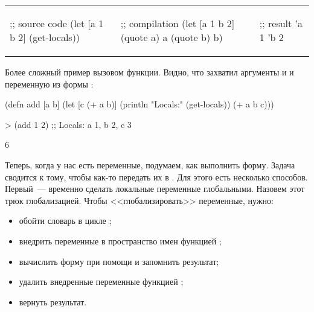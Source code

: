 \begin{english}
\noindent
\begin{tabular}{ @{}p{4cm} @{}p{4cm} @{}p{3cm} }

  \begin{clojure}
;; source code
(let [a 1
      b 2]
  (get-locals))
  \end{clojure}

&

  \begin{clojure}
;; compilation
(let [a 1
      b 2]
  {(quote a) a
   (quote b) b})
  \end{clojure}

&

  \begin{clojure}
;; result
{'a 1 'b 2}
  \end{clojure}

\end{tabular}
\end{english}

Более сложный пример вызовом функции. Видно, что  захватил аргументы  и  и переменную  из формы :

\begin{english}
  \begin{clojure}
(defn add
  [a b]
  (let [c (+ a b)]
    (println "Locals:" (get-locals))
    (+ a b c)))

> (add 1 2)
;; Locals: {a 1, b 2, c 3}

6
  \end{clojure}
\end{english}

Теперь, когда у нас есть переменные, подумаем, как выполнить форму. Задача сводится к тому, чтобы как-то передать их в . Для этого есть несколько способов. Первый~--- временно сделать локальные переменные глобальными. Назовем этот трюк глобализацией. Чтобы <<глобализировать>> переменные, нужно:

\begin{itemize}

\item
  обойти словарь  в цикле ;

\item
  внедрить переменные в пространство имен функцией ;

\item
  вычислить форму при помощи  и запомнить результат;

\item
  удалить внедренные переменные функцией ;

\item
  вернуть результат.

\end{itemize}

